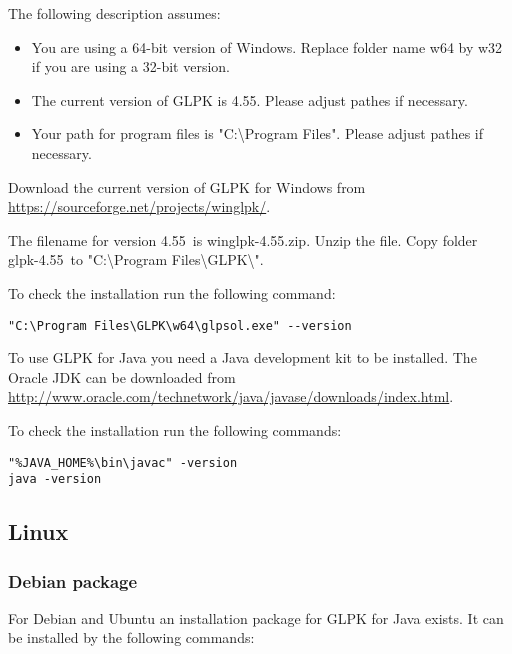 \documentclass[a4paper,11pt]{report}
\newcommand{\glpkVersionMajor}{4}
\newcommand{\glpkVersionMinor}{55}
\begin{document}
The following description assumes:

\begin{itemize}
\item You are using a 64-bit version of Windows. Replace folder name w64 by w32 if you are using a 32-bit version.
\item The current version of GLPK is \glpkVersionMajor.\glpkVersionMinor. Please adjust pathes if necessary.
\item Your path for program files is "C:\textbackslash Program Files". Please adjust pathes if necessary.
\end{itemize}

Download the current version of GLPK for Windows from \href{https://sourceforge.net/projects/winglpk/}{https://sourceforge.net/projects/winglpk/}.

The filename for version \glpkVersionMajor.\glpkVersionMinor\ is winglpk-\glpkVersionMajor.\glpkVersionMinor.zip. Unzip the file. Copy folder glpk-\glpkVersionMajor.\glpkVersionMinor\ to "C:\textbackslash Program Files\textbackslash GLPK\textbackslash ".

To check the installation run the following command:

\begin{lstlisting}
"C:\Program Files\GLPK\w64\glpsol.exe" --version
\end{lstlisting}

To use GLPK for Java you need a Java development kit to be installed. The Oracle JDK can be downloaded from \href{http://www.oracle.com/technetwork/java/javase/downloads/index.html}{http://www.oracle.com/technetwork/java/javase/downloads/index.html}.

To check the installation run the following commands:

\begin{lstlisting}
"%JAVA_HOME%\bin\javac" -version
java -version
\end{lstlisting}

\subsection{Linux}
\subsubsection{Debian package}

For Debian and Ubuntu an installation package for GLPK for Java exists. It can be installed by the following commands:
\end{document}

